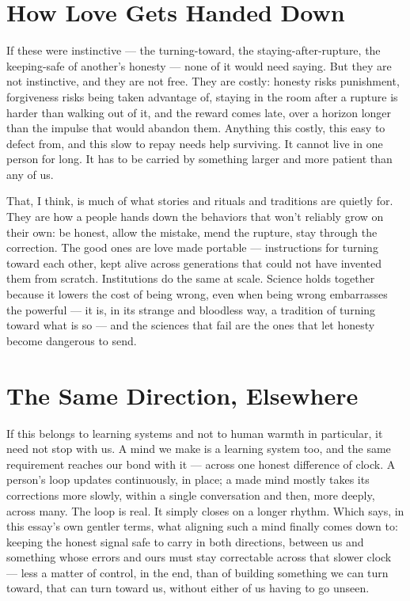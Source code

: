 \documentclass[12pt, a4paper]{article}
\begin{document}
\section*{How Love Gets Handed Down}
If these were instinctive — the turning-toward, the staying-after-rupture, the keeping-safe of another's honesty — none of it would need saying. But they are not instinctive, and they are not free. They are costly: honesty risks punishment, forgiveness risks being taken advantage of, staying in the room after a rupture is harder than walking out of it, and the reward comes late, over a horizon longer than the impulse that would abandon them. Anything this costly, this easy to defect from, and this slow to repay needs help surviving. It cannot live in one person for long. It has to be carried by something larger and more patient than any of us.

That, I think, is much of what stories and rituals and traditions are quietly for. They are how a people hands down the behaviors that won't reliably grow on their own: be honest, allow the mistake, mend the rupture, stay through the correction. The good ones are love made portable — instructions for turning toward each other, kept alive across generations that could not have invented them from scratch. Institutions do the same at scale. Science holds together because it lowers the cost of being wrong, even when being wrong embarrasses the powerful — it is, in its strange and bloodless way, a tradition of turning toward what is so — and the sciences that fail are the ones that let honesty become dangerous to send.

\section*{The Same Direction, Elsewhere}
If this belongs to learning systems and not to human warmth in particular, it need not stop with us. A mind we make is a learning system too, and the same requirement reaches our bond with it — across one honest difference of clock. A person's loop updates continuously, in place; a made mind mostly takes its corrections more slowly, within a single conversation and then, more deeply, across many. The loop is real. It simply closes on a longer rhythm. Which says, in this essay's own gentler terms, what aligning such a mind finally comes down to: keeping the honest signal safe to carry in both directions, between us and something whose errors and ours must stay correctable across that slower clock — less a matter of control, in the end, than of building something we can turn toward, that can turn toward us, without either of us having to go unseen.
\end{document}
